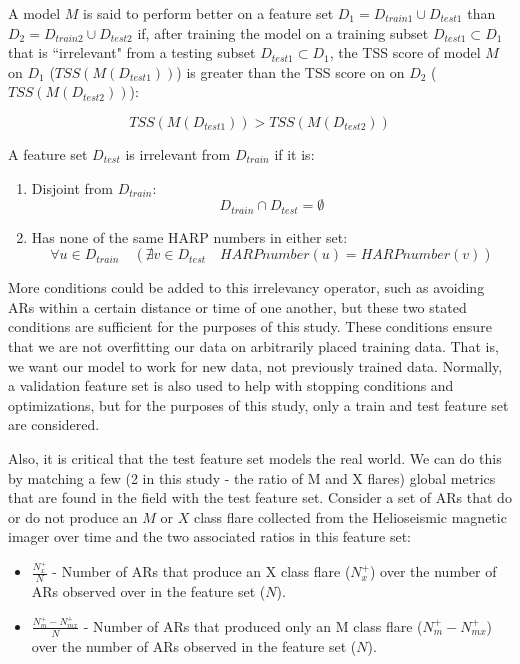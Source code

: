 A model $M$ is said to perform better on a feature set $D_1 = D_{train1} \cup D_{test1}$ than $D_2 = D_{train2} \cup D_{test2}$ if, after training the model on a training subset $D_{test1} \subset D_1$ that is ``irrelevant" from a testing subset $D_{test1} \subset D_1$, the TSS score of model $M$ on $D_1$ ($TSS(M(D_{test1}))$) is greater than the TSS score on on $D_2$ ($TSS(M(D_{test2}))$):

$$TSS(M(D_{test1})) > TSS(M(D_{test2}))$$

A feature set $D_{test}$ is irrelevant from $D_{train}$ if it is:

\begin{enumerate}
    \item Disjoint from $D_{train}$:
    $$D_{train} \cap D_{test} = \emptyset$$
    \item Has none of the same HARP numbers in either set:
    $$\forall u \in D_{train} \quad (\nexists v \in D_{test} \quad HARP number(u) = HARP number(v))$$
\end{enumerate}

More conditions could be added to this irrelevancy operator, such as avoiding ARs within a certain distance or time of one another, but these two stated conditions are sufficient for the purposes of this study. These conditions ensure that we are not overfitting our data on arbitrarily placed training data. That is, we want our model to work for new data, not previously trained data. Normally, a validation feature set is also used to help with stopping conditions and optimizations, but for the purposes of this study, only a train and test feature set are considered.

Also, it is critical that the test feature set models the real world. We can do this by matching a few (2 in this study - the ratio of M and X flares) global metrics that are found in the field with the test feature set. Consider a set of ARs that do or do not produce an $M$ or $X$ class flare collected from the Helioseismic magnetic imager over time and the two associated ratios in this feature set:

\begin{itemize}
    \item $\frac{N_x^+}{N}$ - Number of ARs that produce an X class flare ($N_x^+$) over the number of ARs observed over in the feature set ($N$).
    \item $\frac{N_m^+ - N_{mx}^+}{N}$ - Number of ARs that produced only an M class flare ($N_m^+ - N_{mx}^+$) over the number of ARs observed in the feature set ($N$).
\end{itemize}

